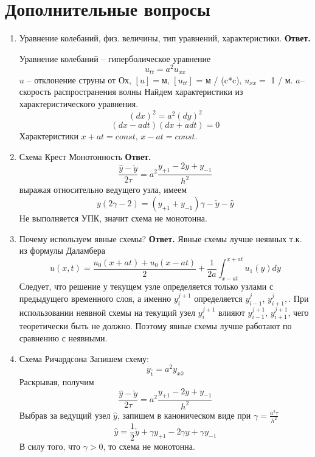\documentclass{article}
\begin{document}
	\section{Дополнительные вопросы}
	\begin{enumerate}
		\item Уравнение колебаний, физ. величины, тип уравнений, характеристики.
		\newline
		{\bfseries Ответ. } 
		
		Уравнение колебаний -- гиперболическое уравнение
		\[
		u_{tt} = a^2 u_{xx}
		\]
		$u$ -- отклонение струны от Ох, $[u] = $м, $[u_{tt}]$ = м / (c*c), $u_{xx} =$  1 / м. $a$--скорость распространения волны
		 Найдем характеристики из характеристического уравнения.
		\[
		(dx)^2 = a^2 (dy)^2
		\]
		\[
		(dx-adt)(dx+adt) = 0
		\]
		Характеристики $x +at = const, \, x-at = const$. 
		
		
		
		
		
		
		\item Схема Крест Монотонность
		\newline 
		{\bfseries Ответ. } 
		\[
		\frac{\hat{y} - \check{y}}{2\tau} = a^2 \frac{y_{+1}-2y+y_{-1}}{h^2}
		\]
		выражая относительно ведущего узла, имеем 
		\[
		y(2\gamma -2) = (y_{+1}+y_{-1}) \gamma - \check{y}- \hat{y}
		\]
		Не выполняется УПК, значит схема не монотонна.
		\item Почему используем явные схемы? 
		\newline 
		{\bfseries Ответ. } 
		Явные схемы лучше неявных т.к. из формулы Даламбера 
		\[
		u(x,t) = \frac{u_0(x+at)+u_0(x-at)}{2} + \frac{1}{2a}\int_{x-at}^{x+at} u_1(y)dy
		\]
		Следует, что решение у текущем узле определяется только узлами с предыдущего временного слоя, а именно $y_i^{j+1}$ определяется $y_{i-1} ^j,\,y_{i+1} ^j, $. При использовании неявной схемы на текущий узел $y_i^{j+1}$ влияют $y_{i-1}^{j+1},\, y_{i+1}^{j+1}$, чего теоретически быть не должно. Поэтому явные схемы лучше работают по сравнению с неявными.
		\item Схема Ричардсона 
		  Запишем схему:
		$$y_{\mathop t\limits^ \circ} = a^2y_{x\bar{x}}$$
		Раскрывая, получим
		\begin{equation*}
			\frac{\hat{y} - \check{y}}{2\tau} = a^2 \frac{y_{+1} - 2y + y_{-1}}{h^2}
		\end{equation*}
		Выбрав за ведущий узел $\hat{y}$, запишем в каноническом виде при $\gamma = \frac{a^2 \tau}{h^2}$
		\begin{equation*}
			\hat{y} = \frac{1}{2}\check{y} + \gamma y_{+1} - 2\gamma y + \gamma y_{-1}
		\end{equation*}
		В силу того, что $\gamma > 0$, то схема не монотонна. 



\end{enumerate}
\end{document}
